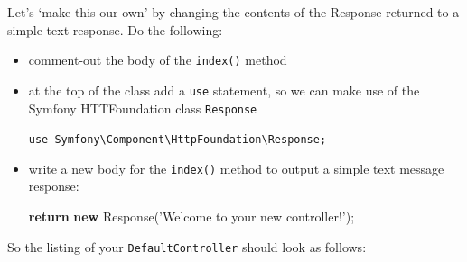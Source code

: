 \documentclass[a4paperpaper,openright]{book}
\newenvironment{Shaded}{}{}
\newcommand{\CommentTok}[1]{\textcolor[rgb]{0.38,0.63,0.69}{\textit{#1}}}
\newcommand{\KeywordTok}[1]{\textcolor[rgb]{0.00,0.44,0.13}{\textbf{#1}}}
\newcommand{\NormalTok}[1]{#1}
\newcommand{\OtherTok}[1]{\textcolor[rgb]{0.00,0.44,0.13}{#1}}
\newcommand{\StringTok}[1]{\textcolor[rgb]{0.25,0.44,0.63}{#1}}
\begin{document}
Let's `make this our own' by changing the contents of the Response
returned to a simple text response. Do the following:

\begin{itemize}
\item
  comment-out the body of the \texttt{index()} method
\item
  at the top of the class add a \texttt{use} statement, so we can make
  use of the Symfony HTTFoundation class \texttt{Response}

  \texttt{use\ Symfony\textbackslash{}Component\textbackslash{}HttpFoundation\textbackslash{}Response;}
\item
  write a new body for the \texttt{index()} method to output a simple
  text message response:

\begin{Shaded}
\begin{Highlighting}[]
    \KeywordTok{return} \KeywordTok{new}\NormalTok{ Response}\OtherTok{(}\StringTok{'Welcome to your new controller!'}\OtherTok{);}
\end{Highlighting}
\end{Shaded}
\end{itemize}

So the listing of your \texttt{DefaultController} should look as
follows:

\begin{Shaded}
\end{Shaded}
\end{document}
